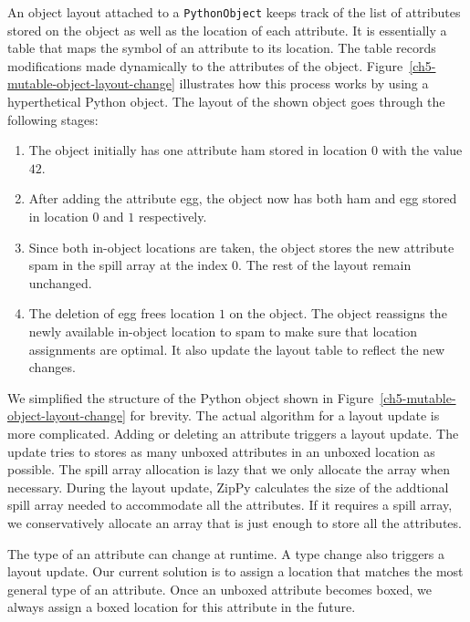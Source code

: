An object layout attached to a \texttt{PythonObject} keeps track of the list of attributes stored on the object as well as the location of each attribute.
It is essentially a table that maps the symbol of an attribute to its location.
The table records modifications made dynamically to the attributes of the object.
Figure~\ref{ch5-mutable-object-layout-change} illustrates how this process works by using a hyperthetical Python object.
The layout of the shown object goes through the following stages:

\begin{enumerate}

\item The object initially has one attribute \textsf{ham} stored in location $0$ with the value $42$.

\item After adding the attribute \textsf{egg}, the object now has both \textsf{ham} and \textsf{egg} stored in location $0$ and $1$ respectively.

\item Since both in-object locations are taken, the object stores the new attribute \textsf{spam} in the spill array at the index $0$.
The rest of the layout remain unchanged.

\item The deletion of \textsf{egg} frees location $1$ on the object.
The object reassigns the newly available in-object location to \textsf{spam} to make sure that location assignments are optimal.
It also update the layout table to reflect the new changes.

\end{enumerate}

We simplified the structure of the Python object shown in Figure~\ref{ch5-mutable-object-layout-change} for brevity.
The actual algorithm for a layout update is more complicated.
Adding or deleting an attribute triggers a layout update.
The update tries to stores as many unboxed attributes in an unboxed location as possible.
The spill array allocation is lazy that we only allocate the array when necessary.
During the layout update, ZipPy calculates the size of the addtional spill array needed to accommodate all the attributes.
If it requires a spill array, we conservatively allocate an array that is just enough to store all the attributes.

The type of an attribute can change at runtime.
A type change also triggers a layout update.
Our current solution is to assign a location that matches the most general type of an attribute.
Once an unboxed attribute becomes boxed, we always assign a boxed location for this attribute in the future.

